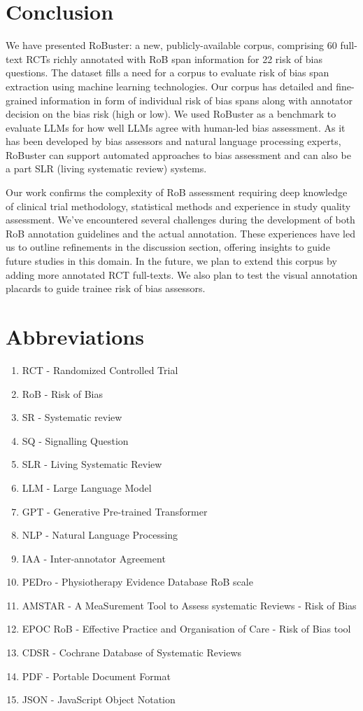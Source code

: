 \documentclass[sn-mathphys,Numbered]{sn-jnl}%
\theoremstyle{thmstyleone}%
\theoremstyle{thmstyletwo}%
\theoremstyle{thmstylethree}%
\begin{document}
\section{Conclusion}
\label{sec:conclusion}
%
We have presented RoBuster: a new, publicly-available corpus, comprising 60 full-text RCTs richly annotated with RoB span information for 22 risk of bias questions.
The dataset fills a need for a corpus to evaluate risk of bias span extraction using machine learning technologies.
Our corpus has detailed and fine-grained information in form of individual risk of bias spans along with annotator decision on the bias risk (high or low).
We used RoBuster as a benchmark to evaluate LLMs for how well LLMs agree with human-led bias assessment.
As it has been developed by bias assessors and natural language processing experts, RoBuster can support automated approaches to bias assessment and can also be a part SLR (living systematic review) systems.


Our work confirms the complexity of RoB assessment requiring deep knowledge of clinical trial methodology, statistical methods and experience in study quality assessment.
We've encountered several challenges during the development of both RoB annotation guidelines and the actual annotation.
These experiences have led us to outline refinements in the discussion section, offering insights to guide future studies in this domain.
In the future, we plan to extend this corpus by adding more annotated RCT full-texts.
We also plan to test the visual annotation placards to guide trainee risk of bias assessors.
%
%
%
\section{Abbreviations}%
%
\begin{enumerate}
    \item RCT - Randomized Controlled Trial
    \item RoB - Risk of Bias
    \item SR - Systematic review
    \item SQ - Signalling Question
    \item SLR - Living Systematic Review
    \item LLM - Large Language Model
    \item GPT - Generative Pre-trained Transformer
    \item NLP - Natural Language Processing
    \item IAA - Inter-annotator Agreement
    \item PEDro - Physiotherapy Evidence Database RoB scale
    \item AMSTAR - A MeaSurement Tool to Assess systematic Reviews - Risk of Bias
    \item EPOC RoB - Effective Practice and Organisation of Care - Risk of Bias tool
    \item CDSR - Cochrane Database of Systematic Reviews
    \item PDF - Portable Document Format
    \item JSON - JavaScript Object Notation
\end{enumerate}
%
%
%
\backmatter
\end{document}
